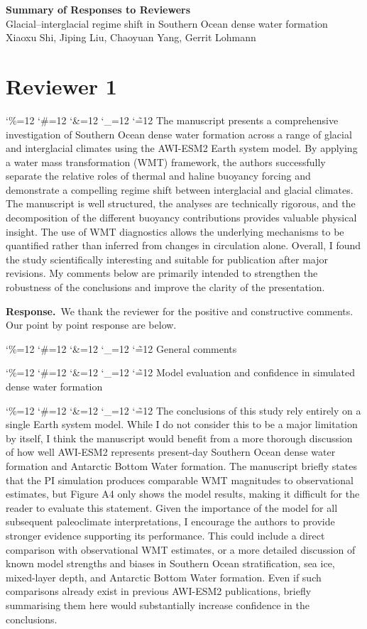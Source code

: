 \documentclass[11pt,a4paper]{article}
\newcommand{\reviewer}[1]{\section*{#1}}
\newcommand{\comment}[1]{\par\medskip\noindent\color{black}\begingroup\catcode`\%=12 \catcode`\#=12 \catcode`\&=12 \catcode`\_=12 \catcode`\~=12 \commentbody}
\newcommand{\commentbody}[1]{#1\endgroup\par\smallskip}
\newcommand{\response}{\par\noindent\color{chgcol}\textbf{Response.}\ }
\begin{document}
\begin{center} 
{\Large\bfseries Summary of Responses to Reviewers}\\[4pt]
{\large Glacial--interglacial regime shift in Southern Ocean dense water formation}\\[2pt]
Xiaoxu Shi, Jiping Liu, Chaoyuan Yang, Gerrit Lohmann
\end{center}

\bigskip


\reviewer{Reviewer 1}

\comment{R1}{The manuscript presents a comprehensive investigation of Southern Ocean dense water formation across a range of glacial and interglacial climates using the AWI-ESM2 Earth system model. By applying a water mass transformation (WMT) framework, the authors successfully separate the relative roles of thermal and haline buoyancy forcing and demonstrate a compelling regime shift between interglacial and glacial climates. The manuscript is well structured, the analyses are technically rigorous, and the decomposition of the different buoyancy contributions provides valuable physical insight. The use of WMT diagnostics allows the underlying mechanisms to be quantified rather than inferred from changes in circulation alone. Overall, I found the study scientifically interesting and suitable for publication after major revisions. My comments below are primarily intended to strengthen the robustness of the conclusions and improve the clarity of the presentation.}

\response We thank the reviewer for the positive and constructive comments. Our point by point response are below.

\comment{R1}{General comments}

\comment{R1}{Model evaluation and confidence in simulated dense water formation}

\comment{R1}{The conclusions of this study rely entirely on a single Earth system model. While I do not consider this to be a major limitation by itself, I think the manuscript would benefit from a more thorough discussion of how well AWI-ESM2 represents present-day Southern Ocean dense water formation and Antarctic Bottom Water formation. The manuscript briefly states that the PI simulation produces comparable WMT magnitudes to observational estimates, but Figure A4 only shows the model results, making it difficult for the reader to evaluate this statement. Given the importance of the model for all subsequent paleoclimate interpretations, I encourage the authors to provide stronger evidence supporting its performance. This could include a direct comparison with observational WMT estimates, or a more detailed discussion of known model strengths and biases in Southern Ocean stratification, sea ice, mixed-layer depth, and Antarctic Bottom Water formation. Even if such comparisons already exist in previous AWI-ESM2 publications, briefly summarising them here would substantially increase confidence in the conclusions.}
\end{document}
